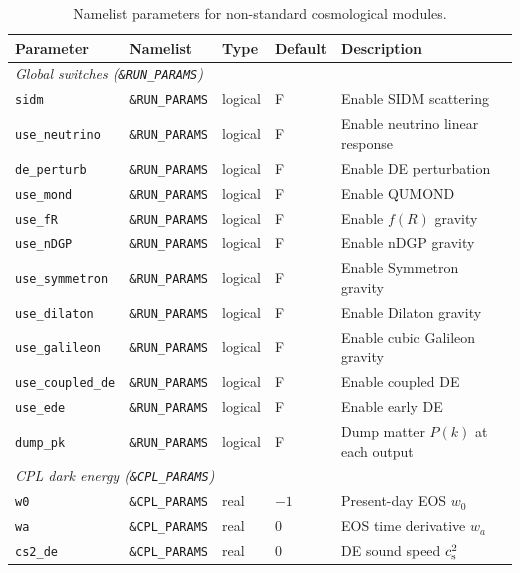 \documentclass[fleqn,usenatbib]{mnras}
\newcommand{\code}[1]{\texttt{#1}}
\newcommand{\cst}{c_{\rm s}^2}
\begin{document}
\begin{table}
\centering
\caption{Namelist parameters for non-standard cosmological modules.}
\label{tab:namelist_full}
\small
\begin{tabular}{lllll}
\toprule
Parameter & Namelist & Type & Default & Description \\
\midrule
\multicolumn{5}{l}{\emph{Global switches (\code{\&RUN\_PARAMS})}} \\
\code{sidm}             & \code{\&RUN\_PARAMS}      & logical & F   & Enable SIDM scattering \\
\code{use\_neutrino}    & \code{\&RUN\_PARAMS}      & logical & F   & Enable neutrino linear response \\
\code{de\_perturb}      & \code{\&RUN\_PARAMS}      & logical & F   & Enable DE perturbation \\
\code{use\_mond}        & \code{\&RUN\_PARAMS}      & logical & F   & Enable QUMOND \\
\code{use\_fR}          & \code{\&RUN\_PARAMS}      & logical & F   & Enable $f(R)$ gravity \\
\code{use\_nDGP}        & \code{\&RUN\_PARAMS}      & logical & F   & Enable nDGP gravity \\
\code{use\_symmetron}   & \code{\&RUN\_PARAMS}      & logical & F   & Enable Symmetron gravity \\
\code{use\_dilaton}     & \code{\&RUN\_PARAMS}      & logical & F   & Enable Dilaton gravity \\
\code{use\_galileon}    & \code{\&RUN\_PARAMS}      & logical & F   & Enable cubic Galileon gravity \\
\code{use\_coupled\_de} & \code{\&RUN\_PARAMS}      & logical & F   & Enable coupled DE \\
\code{use\_ede}         & \code{\&RUN\_PARAMS}      & logical & F   & Enable early DE \\
\code{dump\_pk}         & \code{\&RUN\_PARAMS}      & logical & F   & Dump matter $P(k)$ at each output \\
\midrule
\multicolumn{5}{l}{\emph{CPL dark energy (\code{\&CPL\_PARAMS})}} \\
\code{w0}               & \code{\&CPL\_PARAMS}      & real    & $-1$ & Present-day EOS $w_0$ \\
\code{wa}               & \code{\&CPL\_PARAMS}      & real    & 0   & EOS time derivative $w_a$ \\
\code{cs2\_de}          & \code{\&CPL\_PARAMS}      & real    & 0   & DE sound speed $\cst$ \\

\end{tabular}
\end{table}
\end{document}
